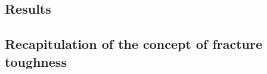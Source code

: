 \documentclass[12pt,onecolumn]{article}
\makeatletter
\DeclareRobustCommand*{\nameref}[1]{%
      \emph{\myorg@nameref{#1}}%
    }%
\newcommand{\EA}{\textit{Ea.\@}\xspace}
\makeatother
\begin{document}
\begin{bibunit}



\section*{Results}
\label{sec:res}

\subsection*{Recapitulation of the concept of fracture toughness}
\label{sec:tdef}


\end{bibunit}
\end{document}
